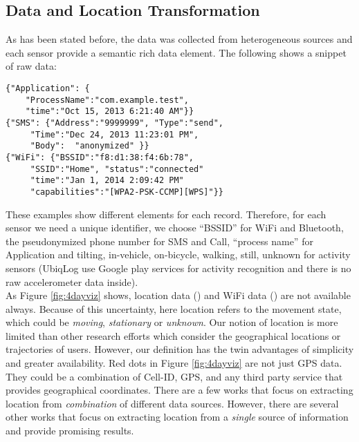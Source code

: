 \documentclass{sig-alternate}
\begin{document}
\subsection{Data and Location Transformation}
As has been stated before, the data was collected from heterogeneous sources and each sensor provide a semantic rich data element. The following shows a snippet of raw data:
\vspace{-0.1cm}
\small
\begin{verbatim}
{"Application": { 
 	"ProcessName":"com.example.test", 
 	"time":"Oct 15, 2013 6:21:40 AM"}} 
{"SMS": {"Address":"9999999", "Type":"send", 
     "Time":"Dec 24, 2013 11:23:01 PM", 
     "Body":  "anonymized" }} 
{"WiFi": {"BSSID":"f8:d1:38:f4:6b:78", 
     "SSID":"Home", "status":"connected" 
     "time":"Jan 1, 2014 2:09:42 PM" 
     "capabilities":"[WPA2-PSK-CCMP][WPS]"}}  
\end{verbatim}
\vspace{-0.1cm}
\normalsize
These examples show different elements for each record. Therefore, for each sensor we need a unique identifier, we choose ``BSSID'' for WiFi and Bluetooth, the pseudonymized phone number for SMS and Call, ``process name'' for Application and tilting, in-vehicle, on-bicycle, walking, still, unknown for activity sensors (UbiqLog use Google play services for activity recognition and there is no raw accelerometer data inside).\\
As Figure \ref{fig:4dayviz} shows, location data (\textcolor{red}{}) and WiFi data (\textcolor{blue}{}) are not available always. Because of this uncertainty, here location refers to the movement state, which could be \emph{moving}, \emph{stationary} or \emph{unknown}. Our notion of location is more limited than other research efforts which consider the geographical locations or trajectories of users. However, our definition has the twin advantages of simplicity and greater availability. Red dots in Figure \ref{fig:4dayviz}  are not just GPS data. They could be a combination of Cell-ID, GPS, and any third party service that provides geographical coordinates. There are a few works \cite{gpsgsm, enefpossmart} that focus on extracting location from \emph{combination} of different data sources. However, there are several other works that focus on extracting location from a \emph{single} source of information \cite{discgps, minindqu, minprofreq, mineusermob, semloc} and provide promising results. \\
\end{document}
